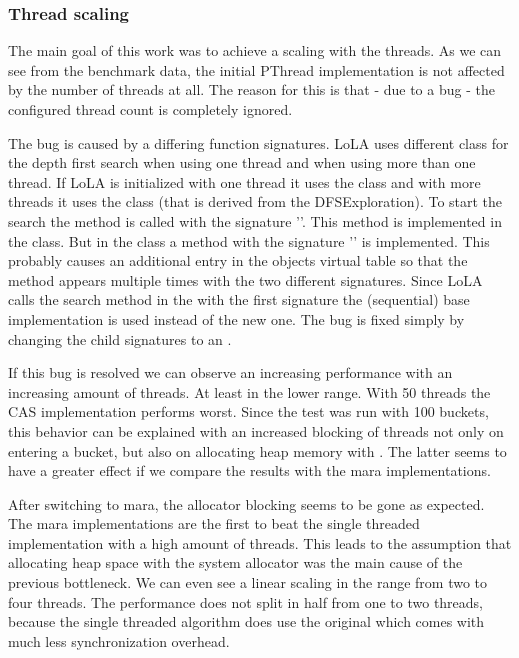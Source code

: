 \subsubsection{Thread scaling}
The main goal of this work was to achieve a scaling with the threads. As we can see from the benchmark data, the initial PThread implementation is not affected by the number of threads at all. The reason for this is that - due to a bug - the configured thread count is completely ignored. 

The bug is caused by a differing function signatures. LoLA uses different class for the depth first search when using one thread and when using more than one thread. If LoLA is initialized with one thread it uses the  class and with more threads it uses the  class (that is derived from the DFSExploration). To start the search the  method is called with the signature ''. This method is implemented in the  class. But in the  class a method with the signature '' is implemented. This probably causes an additional entry in the objects virtual table so that the  method appears multiple times with the two different signatures. Since LoLA calls the search method in the  with the first signature the (sequential) base implementation is used instead of the new one. The bug is fixed simply by changing the child signatures  to an .

If this bug is resolved we can observe an increasing performance with an increasing amount of threads. At least in the lower range. With 50 threads the CAS implementation performs worst. Since the test was run with 100 buckets, this behavior can be explained with an increased blocking of threads not only on entering a bucket, but also on allocating heap memory with . The latter seems to have a greater effect if we compare the results with the mara implementations.

After switching to mara, the allocator blocking seems to be gone as expected. The mara implementations are the first to beat the single threaded implementation with a high amount of threads. This leads to the assumption that allocating heap space with the system allocator was the main cause of the previous bottleneck. We can even see a linear scaling in the range from two to four threads. The performance does not split in half from one to two threads, because the single threaded algorithm does use the original  which comes with much less synchronization overhead.

